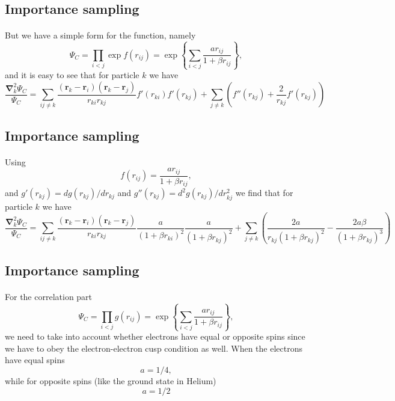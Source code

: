 \documentclass[%
twoside,                 %
final,                   %
10pt]{article}
\begin{document}
\subsection*{Importance sampling}

\paragraph{}
But we have a simple form for the function, namely
\[
\Psi_{C}=\prod_{i< j}\exp{f(r_{ij})}= \exp{\left\{\sum_{i<j}\frac{ar_{ij}}{1+\beta r_{ij}}\right\}},
\]
and it is easy to see that for particle  $k$
we have
\[
  \frac{\mathbf{\nabla}^2_k \Psi_C}{\Psi_C }=
\sum_{ij\ne k}\frac{(\mathbf{r}_k-\mathbf{r}_i)(\mathbf{r}_k-\mathbf{r}_j)}{r_{ki}r_{kj}}f'(r_{ki})f'(r_{kj})+
\sum_{j\ne k}\left( f''(r_{kj})+\frac{2}{r_{kj}}f'(r_{kj})\right)
\]




\subsection*{Importance sampling}

\paragraph{}
Using 
\[
f(r_{ij})= \frac{ar_{ij}}{1+\beta r_{ij}},
\]
and $g'(r_{kj})=dg(r_{kj})/dr_{kj}$ and 
$g''(r_{kj})=d^2g(r_{kj})/dr_{kj}^2$  we find that for particle  $k$
we have
\[
  \frac{\mathbf{\nabla}^2_k \Psi_C}{\Psi_C }=
\sum_{ij\ne k}\frac{(\mathbf{r}_k-\mathbf{r}_i)(\mathbf{r}_k-\mathbf{r}_j)}{r_{ki}r_{kj}}\frac{a}{(1+\beta r_{ki})^2}
\frac{a}{(1+\beta r_{kj})^2}+
\sum_{j\ne k}\left(\frac{2a}{r_{kj}(1+\beta r_{kj})^2}-\frac{2a\beta}{(1+\beta r_{kj})^3}\right)
\]




\subsection*{Importance sampling}

\paragraph{}
For the correlation part 
\[
\Psi_C=\prod_{i< j}g(r_{ij})= \exp{\left\{\sum_{i<j}\frac{ar_{ij}}{1+\beta r_{ij}}\right\}},
\]
we need to take into account whether electrons have equal or opposite spins since we have to obey the
electron-electron cusp condition as well.  
When the electrons have  equal spins 
\[
a= 1/4,
\]
while for opposite spins (like the ground state in Helium)
\[
a= 1/2
\]
\end{document}
